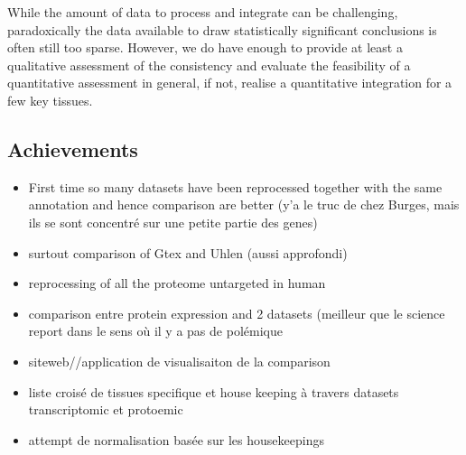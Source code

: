 While the amount of data to process and integrate can be challenging,
paradoxically the data available to draw statistically significant conclusions
is often still too sparse. However, we do have enough to provide at least a
qualitative assessment of the consistency and evaluate the feasibility of a
quantitative assessment in general, if not, realise a quantitative integration
for a few key tissues.

\subsection{Achievements}
\begin{itemize}
    \item First time so many datasets have been reprocessed together with the
        same annotation and hence comparison are better (y'a le truc de chez Burges,
        mais ils se sont concentré sur une petite partie des genes)
    \item surtout comparison of Gtex and Uhlen (aussi approfondi)
    \item reprocessing of all the proteome untargeted in human
    \item comparison entre protein expression and 2 datasets (meilleur que le
        science report dans le sens où il y a pas de polémique
    \item siteweb//application de visualisaiton de la comparison
    \item liste croisé de tissues specifique et house keeping à travers datasets
        transcriptomic et protoemic
    \item attempt de normalisation basée sur les housekeepings
\end{itemize}
